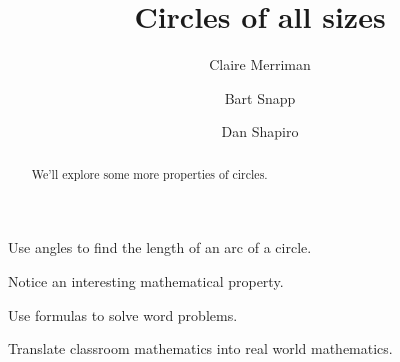 \documentclass[noauthor,hints,nooutcomes,handout]{ximera}
\title{Circles of all sizes}
\author{Claire Merriman \and Bart Snapp \and Dan Shapiro}
\begin{document}
\begin{abstract}
  We'll explore some more properties of circles.
\end{abstract}
\maketitle

\begin{listOutcomes}
\item Use angles to find the length of an arc of a circle.
\item Notice an interesting mathematical property.
\item Use formulas to solve word problems.
\item Translate classroom mathematics into real world mathematics. 
\end{listOutcomes}



\mynewpage



\mynewpage
\end{document}
